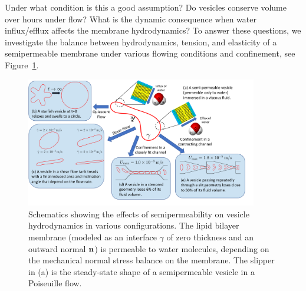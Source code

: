 \documentclass[9pt,twocolumn,twoside,lineno]{pnas-new}
\begin{document}
Under what condition is this a good assumption? Do vesicles conserve
volume over hours under flow? What is the dynamic consequence when water
influx/efflux affects the membrane hydrodynamics? To answer these
questions, we investigate the balance between hydrodynamics, tension,
and elasticity of a semipermeable membrane under various flowing
conditions and confinement, see Figure~\ref{fig:sketch}.

\begin{figure}[htp]
  \centering
  \includegraphics[width=0.9\textwidth]{figures/schematic.pdf}
  \caption{\label{fig:sketch} Schematics showing the effects of
  semipermeability on vesicle hydrodynamics in various configurations. 
  The lipid bilayer membrane (modeled as an interface $\gamma$ of zero
  thickness and an outward normal $\mathbf{n}$) is permeable to water
  molecules, depending on the mechanical normal stress balance on the
  membrane.  The slipper in (a) is the steady-state shape of a
  semipermeable vesicle in a Poiseuille flow.}
\end{figure}
\end{document}
